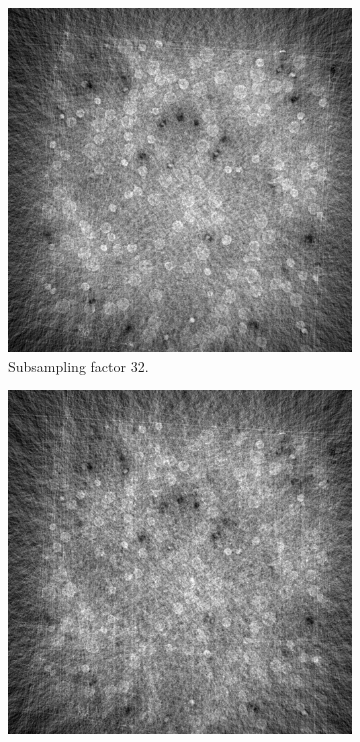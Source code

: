 \begin{figure}
  \medskip

  \begin{subfigure}[t]{.45\textwidth}
    \centering
    \includegraphics[width=\linewidth]{figures/ns32.png}
    \caption{Subsampling factor 32. }
  \end{subfigure}
  \hfill
  \begin{subfigure}[t]{.45\textwidth}
    \centering
    \includegraphics[width=\linewidth]{figures/ns48.png}

\end{subfigure}
\end{figure}
